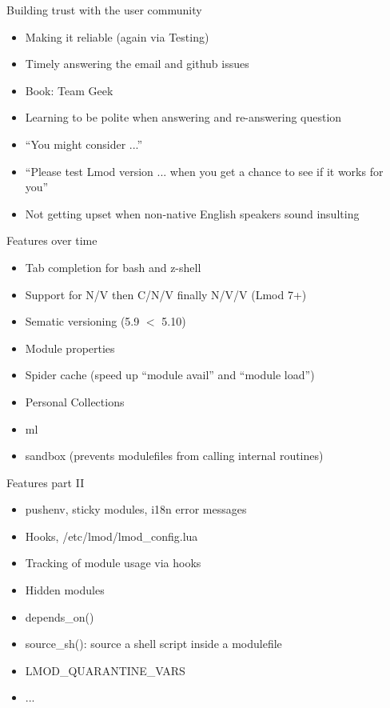 \documentclass{beamer}
\begin{document}
\begin{frame}{Building trust with the user community}
  \begin{itemize}
    \item Making it reliable (again via Testing)
    \item Timely answering the email and github issues 
    \item Book: Team Geek
    \item Learning to be polite when answering and re-answering
      question
    \item ``You might consider ...''
    \item ``Please test Lmod version ... when you get a chance to see
      if it works for you''
    \item Not getting upset when non-native English speakers sound
      insulting
  \end{itemize}
\end{frame}

\begin{frame}{Features over time}
  \begin{itemize}
    \item Tab completion for bash and z-shell
    \item Support for N/V then C/N/V finally N/V/V (Lmod 7+)
    \item Sematic versioning (5.9 $<$ 5.10)
    \item Module properties
    \item Spider cache (speed up ``module avail'' and ``module load'')
    \item Personal Collections
    \item ml
    \item sandbox (prevents modulefiles from calling internal routines)
  \end{itemize}
\end{frame}

\begin{frame}{Features part II}
  \begin{itemize}
    \item pushenv, sticky modules, i18n error messages
    \item Hooks, /etc/lmod/lmod\_config.lua
    \item Tracking of module usage via hooks
    \item Hidden modules
    \item depends\_on()
    \item source\_sh(): source a shell script inside a modulefile
    \item LMOD\_QUARANTINE\_VARS
    \item ...
  \end{itemize}
\end{frame}
\end{document}

